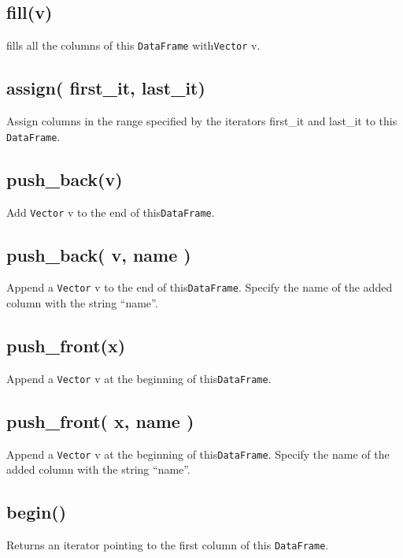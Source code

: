 \documentclass[]{book}
\theoremstyle{definition}
\theoremstyle{definition}
\theoremstyle{remark}
\begin{document}
\subsection{fill(v)}\label{fillv}

fills all the columns of this \texttt{DataFrame} with\texttt{Vector} v.

\subsection{assign( first\_it,
last\_it)}\label{assign-first_it-last_it-1}

Assign columns in the range specified by the iterators first\_it and
last\_it to this \texttt{DataFrame}.

\subsection{push\_back(v)}\label{push_backv}

Add \texttt{Vector} v to the end of this\texttt{DataFrame}.

\subsection{push\_back( v, name )}\label{push_back-v-name}

Append a \texttt{Vector} v to the end of this\texttt{DataFrame}. Specify
the name of the added column with the string ``name''.

\subsection{push\_front(x)}\label{push_frontx}

Append a \texttt{Vector} v at the beginning of this\texttt{DataFrame}.

\subsection{push\_front( x, name )}\label{push_front-x-name-1}

Append a \texttt{Vector} v at the beginning of this\texttt{DataFrame}.
Specify the name of the added column with the string ``name''.

\subsection{begin()}\label{begin-1}

Returns an iterator pointing to the first column of this
\texttt{DataFrame}.
\end{document}
